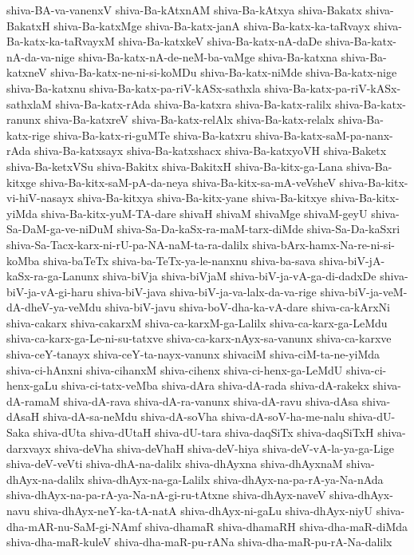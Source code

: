 {shiva-BA-va-vanenxV
shiva-Ba-kAtxnAM
shiva-Ba-kAtxya
shiva-Bakatx
shiva-BakatxH
shiva-Ba-katxMge
shiva-Ba-katx-janA
shiva-Ba-katx-ka-taRvayx
shiva-Ba-katx-ka-taRvayxM
shiva-Ba-katxkeV
shiva-Ba-katx-nA-daDe
shiva-Ba-katx-nA-da-va-nige
shiva-Ba-katx-nA-de-neM-ba-vaMge
shiva-Ba-katxna
shiva-Ba-katxneV
shiva-Ba-katx-ne-ni-si-koMDu
shiva-Ba-katx-niMde
shiva-Ba-katx-nige
shiva-Ba-katxnu
shiva-Ba-katx-pa-riV-kASx-sathxla
shiva-Ba-katx-pa-riV-kASx-sathxlaM
shiva-Ba-katx-rAda
shiva-Ba-katxra
shiva-Ba-katx-ralilx
shiva-Ba-katx-ranunx
shiva-Ba-katxreV
shiva-Ba-katx-relAlx
shiva-Ba-katx-relalx
shiva-Ba-katx-rige
shiva-Ba-katx-ri-guMTe
shiva-Ba-katxru
shiva-Ba-katx-saM-pa-nanx-rAda
shiva-Ba-katxsayx
shiva-Ba-katxshacx
shiva-Ba-katxyoVH
shiva-Baketx
shiva-Ba-ketxVSu
shiva-Bakitx
shiva-BakitxH
shiva-Ba-kitx-ga-Lana
shiva-Ba-kitxge
shiva-Ba-kitx-saM-pA-da-neya
shiva-Ba-kitx-sa-mA-veVsheV
shiva-Ba-kitx-vi-hiV-nasayx
shiva-Ba-kitxya
shiva-Ba-kitx-yane
shiva-Ba-kitxye
shiva-Ba-kitx-yiMda
shiva-Ba-kitx-yuM-TA-dare
shivaH
shivaM
shivaMge
shivaM-geyU
shiva-Sa-DaM-ga-ve-niDuM
shiva-Sa-Da-kaSx-ra-maM-tarx-diMde
shiva-Sa-Da-kaSxri
shiva-Sa-Tacx-karx-ni-rU-pa-NA-naM-ta-ra-dalilx
shiva-bArx-hamx-Na-re-ni-si-koMba
shiva-baTeTx
shiva-ba-TeTx-ya-le-nanxnu
shiva-ba-sava
shiva-biV-jA-kaSx-ra-ga-Lanunx
shiva-biVja
shiva-biVjaM
shiva-biV-ja-vA-ga-di-dadxDe
shiva-biV-ja-vA-gi-haru
shiva-biV-java
shiva-biV-ja-va-lalx-da-va-rige
shiva-biV-ja-veM-dA-dheV-ya-veMdu
shiva-biV-javu
shiva-boV-dha-ka-vA-dare
shiva-ca-kArxNi
shiva-cakarx
shiva-cakarxM
shiva-ca-karxM-ga-Lalilx
shiva-ca-karx-ga-LeMdu
shiva-ca-karx-ga-Le-ni-su-tatxve
shiva-ca-karx-nAyx-sa-vanunx
shiva-ca-karxve
shiva-ceY-tanayx
shiva-ceY-ta-nayx-vanunx
shivaciM
shiva-ciM-ta-ne-yiMda
shiva-ci-hAnxni
shiva-cihanxM
shiva-cihenx
shiva-ci-henx-ga-LeMdU
shiva-ci-henx-gaLu
shiva-ci-tatx-veMba
shiva-dAra
shiva-dA-rada
shiva-dA-rakekx
shiva-dA-ramaM
shiva-dA-rava
shiva-dA-ra-vanunx
shiva-dA-ravu
shiva-dAsa
shiva-dAsaH
shiva-dA-sa-neMdu
shiva-dA-soVha
shiva-dA-soV-ha-me-nalu
shiva-dU-Saka
shiva-dUta
shiva-dUtaH
shiva-dU-tara
shiva-daqSiTx
shiva-daqSiTxH
shiva-darxvayx
shiva-deVha
shiva-deVhaH
shiva-deV-hiya
shiva-deV-vA-la-ya-ga-Lige
shiva-deV-veVti
shiva-dhA-na-dalilx
shiva-dhAyxna
shiva-dhAyxnaM
shiva-dhAyx-na-dalilx
shiva-dhAyx-na-ga-Lalilx
shiva-dhAyx-na-pa-rA-ya-Na-nAda
shiva-dhAyx-na-pa-rA-ya-Na-nA-gi-ru-tAtxne
shiva-dhAyx-naveV
shiva-dhAyx-navu
shiva-dhAyx-neY-ka-tA-natA
shiva-dhAyx-ni-gaLu
shiva-dhAyx-niyU
shiva-dha-mAR-nu-SaM-gi-NAmf
shiva-dhamaR
shiva-dhamaRH
shiva-dha-maR-diMda
shiva-dha-maR-kuleV
shiva-dha-maR-pu-rANa
shiva-dha-maR-pu-rA-Na-dalilx
}
